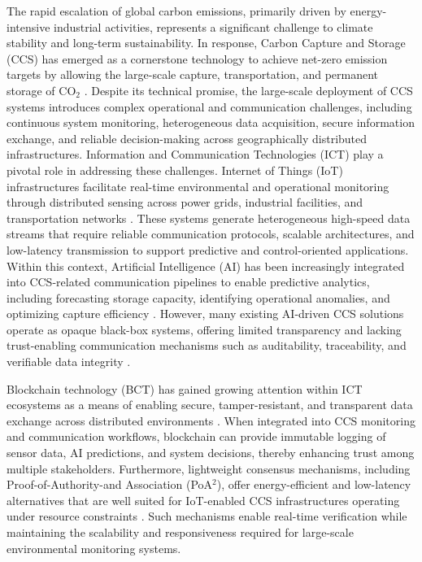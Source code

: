 \documentclass[conference]{IEEEtran}
\begin{document}
The rapid escalation of global carbon emissions, primarily driven by energy-intensive industrial activities, represents a significant challenge to climate stability and long-term sustainability. In response, Carbon Capture and Storage (CCS) has emerged as a cornerstone technology to achieve net-zero emission targets by allowing the large-scale capture, transportation, and permanent storage of CO$_2$ \cite{priya2023artificial, yan2021harnessing}. Despite its technical promise, the large-scale deployment of CCS systems introduces complex operational and communication challenges, including continuous system monitoring, heterogeneous data acquisition, secure information exchange, and reliable decision-making across geographically distributed infrastructures\cite{ajakweictc2025}.
Information and Communication Technologies (ICT) play a pivotal role in addressing these challenges. Internet of Things (IoT) infrastructures facilitate real-time environmental and operational monitoring through distributed sensing across power grids, industrial facilities, and transportation networks \cite{YOUSAF2026101994}. These systems generate heterogeneous high-speed data streams that require reliable communication protocols, scalable architectures, and low-latency transmission to support predictive and control-oriented applications. Within this context, Artificial Intelligence (AI) has been increasingly integrated into CCS-related communication pipelines to enable predictive analytics, including forecasting storage capacity, identifying operational anomalies, and optimizing capture efficiency \cite{ajakwe2025eBCTC, hussain2024application}. However, many existing AI-driven CCS solutions operate as opaque black-box systems, offering limited transparency and lacking trust-enabling communication mechanisms such as auditability, traceability, and verifiable data integrity \cite{ajakwe2025internet}.

Blockchain technology (BCT) has gained growing attention within ICT ecosystems as a means of enabling secure, tamper-resistant, and transparent data exchange across distributed environments \cite{luo2024carbon,ajakwe2026PredBlock}. When integrated into CCS monitoring and communication workflows, blockchain can provide immutable logging of sensor data, AI predictions, and system decisions, thereby enhancing trust among multiple stakeholders. Furthermore, lightweight consensus mechanisms, including Proof-of-Authority-and Association (PoA$^2$), offer energy-efficient and low-latency alternatives that are well suited for IoT-enabled CCS infrastructures operating under resource constraints \cite{kim2024integrating, xie2024renewable}. Such mechanisms enable real-time verification while maintaining the scalability and responsiveness required for large-scale environmental monitoring systems.
\end{document}
